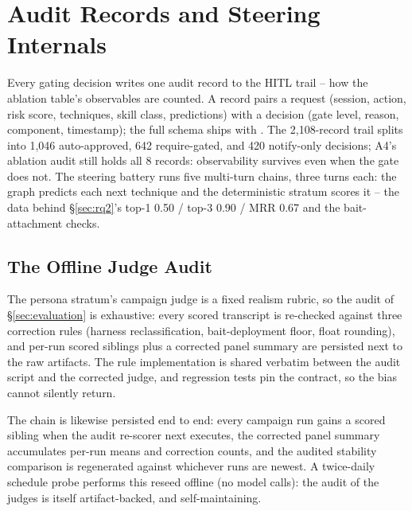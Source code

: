 \section{Audit Records and Steering Internals}
\label{app:audit}
Every gating decision writes one audit record to the HITL trail -- how
the ablation table's observables are counted. A record pairs a request
(session, action, risk score, techniques, skill class, predictions) with
a decision (gate level, reason, component, timestamp); the full schema
ships with . The 2{,}108-record trail
splits into 1{,}046 auto-approved, 642 require-gated, and 420
notify-only decisions; A4's ablation audit still holds all 8 records:
observability survives even when the gate does not. The steering battery
runs five multi-turn chains, three turns each: the graph predicts each
next technique and the deterministic stratum scores it -- the data
behind \S\ref{sec:rq2}'s top-1 0.50 / top-3 0.90 / MRR 0.67 and the
bait-attachment checks.\vspace{-2pt}
\subsection{The Offline Judge Audit}
The persona stratum's campaign judge is a fixed realism rubric, so the
audit of \S\ref{sec:evaluation} is exhaustive: every scored transcript
is re-checked against three correction rules (harness reclassification,
bait-deployment floor, float rounding), and per-run scored siblings plus
a corrected panel summary are persisted next to the raw artifacts. The
rule implementation is shared verbatim between the audit script and the
corrected judge, and regression tests pin the contract, so the bias
cannot silently return.

The chain is likewise persisted end to end: every campaign run gains a
scored sibling when the audit re-scorer next executes, the corrected
panel summary accumulates per-run means and correction counts, and the
audited stability comparison is regenerated against whichever runs are
newest. A twice-daily schedule probe performs this reseed offline (no
model calls): the audit of the judges is itself artifact-backed, and
self-maintaining.
